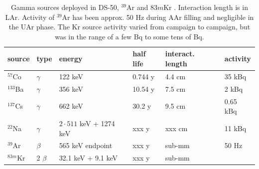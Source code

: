 \begin{table}[htbp]
\caption{Gamma sources deployed in DS-50, $^{39}$Ar and $83m$Kr \cite{lippincott-kr}. Interaction length is in LAr. Activity of $^{39}$Ar has been approx. 50 Hz during AAr filling and negligible in the UAr phase. The Kr source activity varied from campaign to campaign, but was in the range of a few Bq to some tens of Bq.} %
\centering
\begin{tabular}{|l|l|l|l|l|l|}
\hline
\textbf{source} & \textbf{type} & \textbf{energy} & \textbf{half life} & \textbf{interact. length} & \textbf{activity} \\ \hline
$^{57}$Co & $\gamma$ & 122 keV & 0.744 y & 4.4 cm & 35 kBq \\ \hline
$^{133}$Ba & $\gamma$ & 356 keV & 10.54 y & 7.5 cm & 2 kBq \\ \hline
$^{137}$Cs & $\gamma$ & 662 keV & 30.2 y & 9.5 cm & 0.65 kBq \\ \hline
$^{22}$Na & $\gamma$ & $2\cdot 511$ keV + 1274 keV & xxx y & xxx cm & 11 kBq \\ \hline\hline
$^{39}$Ar & $\beta$ &  565 keV endpoint& xxx y & sub-mm & 50 Hz \\ \hline
$^{83m}$Kr & 2 $\beta$ &  32.1 keV + 9.1 keV & xxx y & sub-mm & \\ \hline

\end{tabular}
\label{tbl:GammaSources}
\end{table}

